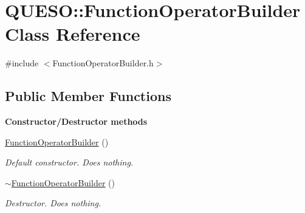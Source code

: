\hypertarget{class_q_u_e_s_o_1_1_function_operator_builder}{\section{Q\-U\-E\-S\-O\-:\-:Function\-Operator\-Builder Class Reference}
\label{class_q_u_e_s_o_1_1_function_operator_builder}
}


{\ttfamily \#include $<$Function\-Operator\-Builder.\-h$>$}

\subsection*{Public Member Functions}
\begin{Indent}{\bf Constructor/\-Destructor methods}\par
\begin{DoxyCompactItemize}
\item 
\hyperlink{class_q_u_e_s_o_1_1_function_operator_builder_a3db017ee660ec6640e599b43271821c6}{Function\-Operator\-Builder} ()
\begin{DoxyCompactList}\small\item\em Default constructor. Does nothing. \end{DoxyCompactList}\item 
\hyperlink{class_q_u_e_s_o_1_1_function_operator_builder_a4b9df10fdd2ea3ee094075866641b008}{$\sim$\-Function\-Operator\-Builder} ()
\begin{DoxyCompactList}\small\item\em Destructor. Does nothing. \end{DoxyCompactList}\end{DoxyCompactItemize}
\end{Indent}

